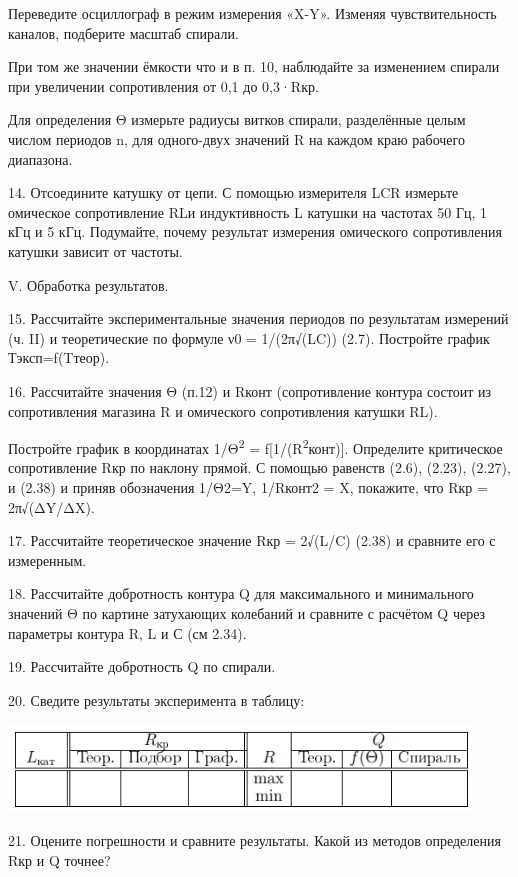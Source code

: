Переведите осциллограф в режим измерения «X-Y». Изменяя чувствительность
каналов, подберите масштаб спирали.

При том же значении ёмкости что и в п. 10, наблюдайте за изменением
спирали при увеличении сопротивления от 0,1 до 0,3·Rкр.

Для определения Θ измерьте радиусы витков спирали, разделённые целым
числом периодов n, для одного-двух значений R на каждом краю рабочего
диапазона.

14. Отсоедините катушку от цепи. С помощью измерителя LCR измерьте
омическое сопротивление RLи индуктивность L катушки на частотах 50 Гц, 1
кГц и 5 кГц. Подумайте, почему результат измерения омического
сопротивления катушки зависит от частоты.

V. Обработка результатов.

15. Рассчитайте экспериментальные значения периодов по результатам
измерений (ч. II) и теоретические по формуле ν0 = 1/(2π√(LC)) (2.7).
Постройте график Тэксп=f(Tтеор).

16. Рассчитайте значения Θ (п.12) и Rконт (сопротивление контура состоит
из сопротивления магазина R и омического сопротивления катушки RL).

Постройте график в координатах 1/Θ\textsuperscript{2} =
f{[}1/(R\textsuperscript{2}конт){]}. Определите критическое
сопротивление Rкр по наклону прямой. С помощью равенств (2.6), (2.23),
(2.27), и (2.38) и приняв обозначения 1/Θ2=Y, 1/Rконт2 = X, покажите,
что Rкр = 2π√(ΔY/ΔX).

17. Рассчитайте теоретическое значение Rкр = 2√(L/C) (2.38) и сравните
его с измеренным.

18. Рассчитайте добротность контура Q для максимального и минимального
значений Θ по картине затухающих колебаний и сравните с расчётом Q через
параметры контура R, L и С (см 2.34).

19. Рассчитайте добротность Q по спирали.

20. Сведите результаты эксперимента в таблицу:

\includegraphics[width=4.85833in,height=0.91939in]{./media/image3.png}

21. Оцените погрешности и сравните результаты. Какой из методов
определения Rкр и Q точнее?

